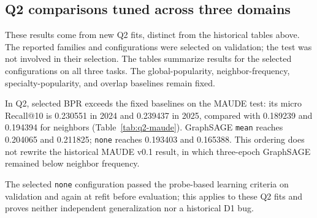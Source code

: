 \subsection{Q2 comparisons tuned across three domains}
\label{sec:q2-results}

These results come from new Q2 fits, distinct from the historical tables above. The reported families and configurations were selected on validation; the test was not involved in their selection. The tables summarize results for the selected configurations on all three tasks\cite{hgbq2methods}. The global-popularity, neighbor-frequency, specialty-popularity, and overlap baselines remain fixed.

\begin{table}[!htbp]
\centering\small
\caption{Q2 comparison on MAUDE: configurations for the six tunable families selected on 2023 validation, followed by mean micro Recall@10 on the 2024 and 2025 tests. The two fixed heuristics have no selection, and their validation values are not reported here. When three repetitions are required, the test value is their mean over seeds 103, 211, and 307; no seed is selected. No new interval is associated with the results.}
\label{tab:q2-maude}

\end{table}

In Q2, selected BPR exceeds the fixed baselines on the MAUDE test: its micro Recall@10 is 0.230551 in 2024 and 0.239437 in 2025, compared with 0.189239 and 0.194394 for neighbors (Table~\ref{tab:q2-maude}). GraphSAGE \texttt{mean} reaches 0.204065 and 0.211825; \texttt{none} reaches 0.193403 and 0.165388. This ordering does not rewrite the historical MAUDE v0.1 result, in which three-epoch GraphSAGE remained below neighbor frequency.

The selected \texttt{none} configuration passed the probe-based learning criteria on validation and again at refit before evaluation; this applies to these Q2 fits and proves neither independent generalization nor a historical D1 bug.

\begin{table}[!htbp]
\centering\small
\caption{Q2 comparison on CMS nursing-home inspections: configurations selected by 2023 validation ROC AUC, followed by 2024, 2025, and pooled test results. Local-history and added-ownership-feature models are paired by family; differences are descriptive and no new interval is calculated.}
\label{tab:q2-cms}

\end{table}

